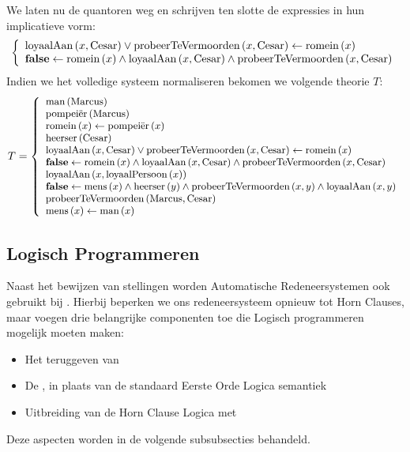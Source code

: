 \begin{leftbar}
\begin{equation}
\end{equation}
We laten nu de quantoren weg en schrijven ten slotte de expressies in hun implicatieve vorm:
\begin{equation}
\left\{\begin{array}{l}
\mbox{loyaalAan}\left( x,\mbox{Cesar} \right)\vee\mbox{probeerTeVermoorden}\left( x,\mbox{Cesar} \right)\leftarrow\mbox{romein}\left( x \right)\\
\mbox{\bf false}\leftarrow\mbox{romein}\left( x \right)\wedge\mbox{loyaalAan}\left( x,\mbox{Cesar} \right)\wedge\mbox{probeerTeVermoorden}\left( x,\mbox{Cesar} \right)
\end{array}\right.
\end{equation}
Indien we het volledige systeem normaliseren bekomen we volgende theorie $T$:
\begin{equation}
\small{
T=\left\{
\begin{array}{l}
\ensuremath{\mbox{man}\left( \mbox{Marcus} \right)}\\
\ensuremath{\mbox{pompeiër}\left( \mbox{Marcus} \right)}\\
\ensuremath{\mbox{romein}\left( x \right)}\leftarrow\ensuremath{\mbox{pompeiër}\left( x \right)}\\
\ensuremath{\mbox{heerser}\left( \mbox{Cesar} \right)}\\
\ensuremath{\mbox{loyaalAan}\left( x,\mbox{Cesar} \right)}\vee\ensuremath{\mbox{probeerTeVermoorden}\left( x,\mbox{Cesar} \right)}\leftarrow\ensuremath{\mbox{romein}\left( x \right)}\\
\mbox{\bf false}\leftarrow\ensuremath{\mbox{romein}\left( x \right)}\wedge\ensuremath{\mbox{loyaalAan}\left( x,\mbox{Cesar} \right)}\wedge\ensuremath{\mbox{probeerTeVermoorden}\left( x,\mbox{Cesar} \right)}\\
\ensuremath{\mbox{loyaalAan}\left( x,\mbox{loyaalPersoon}\left( x \right) \right)}\\
\mbox{\bf false}\leftarrow\ensuremath{\mbox{mens}\left( x \right)}\wedge\ensuremath{\mbox{heerser}\left( y \right)}\wedge\ensuremath{\mbox{probeerTeVermoorden}\left( x,y \right)}\wedge\ensuremath{\mbox{loyaalAan}\left( x,y \right)}\\
\ensuremath{\mbox{probeerTeVermoorden}\left( \mbox{Marcus},\mbox{Cesar} \right)}\\
\ensuremath{\mbox{mens}\left( x \right)}\leftarrow\ensuremath{\mbox{man}\left( x \right)}
\end{array}\right.}
\end{equation}
\end{leftbar}
\subsection{Logisch Programmeren}
Naast het bewijzen van stellingen worden Automatische Redeneersystemen ook gebruikt bij . Hierbij beperken we ons redeneersysteem opnieuw tot Horn Clauses, maar voegen drie belangrijke componenten toe die Logisch programmeren mogelijk moeten maken:
\begin{itemize}
 \item Het teruggeven van 
 \item De , in plaats van de standaard Eerste Orde Logica semantiek
 \item Uitbreiding van de Horn Clause Logica met 
\end{itemize}
Deze aspecten worden in de volgende subsubsecties behandeld.
